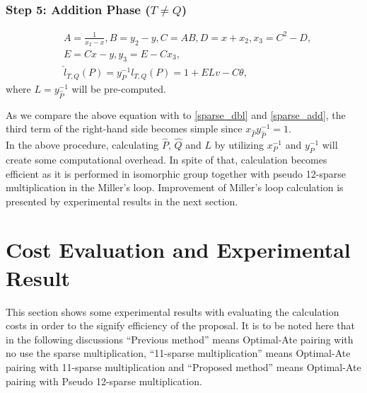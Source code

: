 \subsubsection{Step 5: Addition Phase \texorpdfstring{($T\neq Q$)}{}}
\begin{eqnarray}
&A=\frac{1}{x_2-x}, B=y_2-y, C=AB, D=x+x_2, x_3=C^2-D,\nonumber\\
&E=Cx-y, y_3=E-Cx_3,\nonumber\\
&\hat{l}_{T,Q}(P) = y^{-1}_Pl_{T,Q}(P)=1+ELv-C\theta,\label{pseudo_add}
\end{eqnarray}
where $L=y_{\hat{P}}^{-1}$ will be pre-computed.

As we compare the above equation with to \eqref{sparse_dbl} and \eqref{sparse_add}, the third term of the right-hand side becomes simple since $x_{\hat{P}}y_{\hat{P}}^{-1}=1$.\\
In the above procedure, calculating $\hat{P}$, $\hat{Q}$ and $L$ by utilizing $x_P^{-1}$ and $y_P^{-1}$ will create some computational overhead. In spite of that, calculation becomes efficient as it is performed in isomorphic group together with pseudo 12-sparse multiplication in the Miller's loop. Improvement of Miller's loop calculation is presented by experimental results in the next section. 


\section{Cost Evaluation and Experimental Result}
This section shows some experimental results with evaluating the calculation costs in order to the signify efficiency of the proposal.
It is to be noted here that in the following discussions ``Previous method'' means Optimal-Ate pairing with no use the sparse multiplication, ``11-sparse multiplication'' means Optimal-Ate pairing with 11-sparse multiplication and ``Proposed method'' means Optimal-Ate pairing with Pseudo 12-sparse multiplication.
